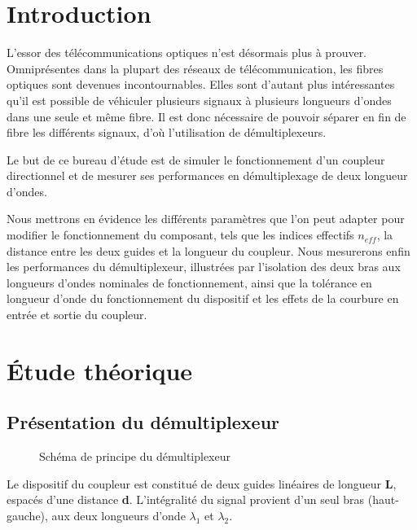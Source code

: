 \documentclass[a4paper,11pt]{report}
\begin{document}


\chapter*{Introduction}

L'essor des télécommunications optiques n'est désormais plus à prouver. Omniprésentes dans la plupart des réseaux de télécommunication, les fibres optiques sont devenues incontournables. Elles sont d'autant plus intéressantes qu'il est possible de véhiculer plusieurs signaux à plusieurs longueurs d'ondes dans une seule et même fibre. \newline
Il est donc nécessaire de pouvoir séparer en fin de fibre les différents signaux, d'où l'utilisation de démultiplexeurs.

Le but de ce bureau d'étude est de simuler le fonctionnement d'un coupleur directionnel et de mesurer ses performances en démultiplexage de deux longueur d'ondes.

Nous mettrons en évidence les différents paramètres que l'on peut adapter pour modifier le fonctionnement du composant, tels que les indices effectifs $n_{eff}$, la distance entre les deux guides et la longueur du coupleur.
\newline
\indent Nous mesurerons enfin les performances du démultiplexeur, illustrées par l'isolation des deux bras aux longueurs d'ondes nominales de fonctionnement, ainsi que la tolérance en longueur d'onde du fonctionnement du dispositif et les effets de la courbure en entrée et sortie du coupleur.


\chapter{Étude théorique}

\section{Présentation du démultiplexeur}
\begin{figure}[h]
    \begin{center}
        
        \caption{Schéma de principe du démultiplexeur}
        \label{fig:}
    \end{center}
\end{figure}

Le dispositif du coupleur est constitué de deux guides linéaires de longueur \textbf{L}, espacés d'une distance \textbf{d}.
L'intégralité du signal provient d'un seul bras (haut-gauche), aux deux longueurs d'onde $\lambda_1$ et $\lambda_2$.
\end{document}
